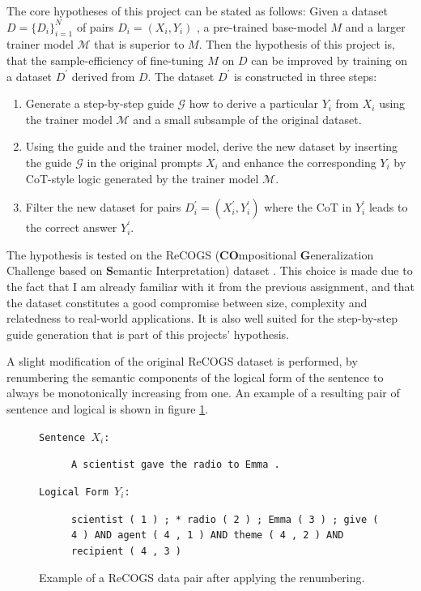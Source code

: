 \documentclass[11pt]{article}
\begin{document}
    The core hypotheses of this project can be stated as follows:
    Given a dataset $D = \{D_i\}_{i=1}^N$ of pairs $D_i = (X_i, Y_i)$ , a pre-trained base-model $M$ and
    a larger trainer model $\mathcal{M}$ that is superior to $M$.
    Then the hypothesis of this project is, that the sample-efficiency of fine-tuning $M$ on $D$ can be improved by
    training on a dataset $D^\prime$ derived from $D$.
    The dataset $D^\prime$ is constructed in three steps:
    \begin{enumerate}
        \item Generate a step-by-step guide $\mathcal{G}$ how to derive a particular $Y_i$ from $X_i$ using the trainer model
        $\mathcal{M}$ and a small subsample of the original dataset.
        \item Using the guide and the trainer model, derive the new dataset by inserting the guide $\mathcal{G}$ in the
        original prompts $X_i$ and enhance the corresponding $Y_i$ by CoT-style logic generated by the trainer model $\mathcal{M}$.
        \item Filter the new dataset for pairs $D^\prime_i = (X^\prime_i, Y^\prime_i)$ where the CoT in $Y^\prime_i$
        leads to the correct answer $Y^\prime_i$.
    \end{enumerate}

    The hypothesis is tested on the ReCOGS (\textbf{CO}mpositional \textbf{G}eneralization Challenge based on
    \textbf{S}emantic Interpretation) dataset \cite{wu_recogs_2024, kim_cogs_2020}.
    This choice is made due to the fact that I am already familiar with it from the previous assignment, and that the
    dataset constitutes a good compromise between size, complexity and relatedness to real-world applications.
    It is also well suited for the step-by-step guide generation that is part of this projects' hypothesis.

    A slight modification of the original ReCOGS dataset is performed, by renumbering the semantic components of the
    logical form of the sentence to always be monotonically increasing from one.
    An example of a resulting pair of sentence and logical is shown in figure \ref{fig:recogs_base}.

    \begin{figure}
        \small
        \begin{description}
            \item[\texttt{Sentence $X_i$:}] \texttt{A scientist gave the radio to Emma .}
            \item[\texttt{Logical Form $Y_i$:}] \texttt{scientist ( 1 ) ; * radio ( 2 ) ; Emma ( 3 ) ; give ( 4 ) AND agent ( 4 , 1 ) AND theme ( 4 , 2 ) AND recipient ( 4 , 3 )}
        \end{description}
        \caption{Example of a ReCOGS data pair after applying the renumbering.}
        \label{fig:recogs_base}
    \end{figure}
\end{document}

